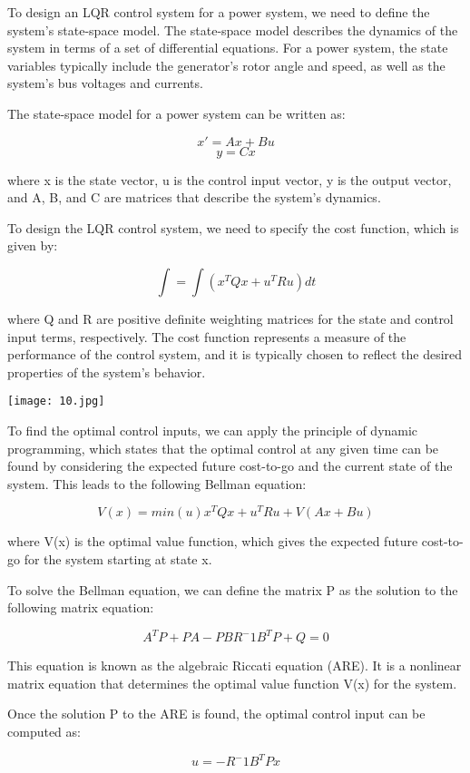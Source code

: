 \documentclass[12pt]{article}
\begin{document}
To design an LQR control system for a power system, we need to define the system's state-space model. The state-space model describes the dynamics of the system in terms of a set of differential equations. For a power system, the state variables typically include the generator's rotor angle and speed, as well as the system's bus voltages and currents.

The state-space model for a power system can be written as:

$$x' = Ax + Bu$$
$$y = Cx$$

where x is the state vector, u is the control input vector, y is the output vector, and A, B, and C are matrices that describe the system's dynamics.

To design the LQR control system, we need to specify the cost function, which is given by:

$$\int = \int(x^TQx + u^TRu) dt$$

where Q and R are positive definite weighting matrices for the state and control input terms, respectively. The cost function represents a measure of the performance of the control system, and it is typically chosen to reflect the desired properties of the system's behavior.



\texttt{[image: 10.jpg]}



To find the optimal control inputs, we can apply the principle of dynamic programming, which states that the optimal control at any given time can be found by considering the expected future cost-to-go and the current state of the system. This leads to the following Bellman equation:

$$V(x) = min(u) {x^TQx + u^TRu + V(Ax + Bu)}$$

where V(x) is the optimal value function, which gives the expected future cost-to-go for the system starting at state x.

To solve the Bellman equation, we can define the matrix P as the solution to the following matrix equation:

$$A^TP + PA - PBR^-1B^TP + Q = 0$$

This equation is known as the algebraic Riccati equation (ARE). It is a nonlinear matrix equation that determines the optimal value function V(x) for the system.

Once the solution P to the ARE is found, the optimal control input can be computed as:

$$u = -R^-1B^TPx$$
\end{document}

